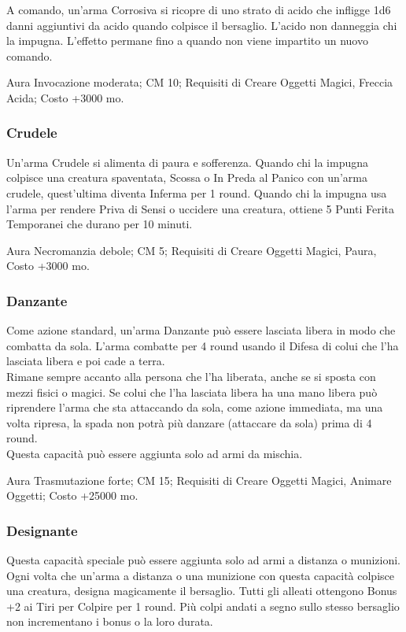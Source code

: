 \begin{multicols}{2}
A comando, un'arma Corrosiva si ricopre di uno strato di acido che infligge 1d6 danni aggiuntivi da acido quando colpisce il bersaglio. L'acido non danneggia chi la impugna. L'effetto permane fino a quando non viene impartito un nuovo comando.

Aura Invocazione moderata; CM 10; Requisiti di Creare Oggetti Magici, Freccia Acida; Costo +3000 mo.


\subsubsection{Crudele}

Un'arma Crudele si alimenta di paura e sofferenza. Quando chi la impugna colpisce una creatura spaventata, Scossa o In Preda al Panico con un'arma crudele, quest'ultima diventa Inferma per 1 round. Quando chi la impugna usa l'arma per rendere Priva di Sensi o uccidere una creatura, ottiene 5 Punti Ferita Temporanei che durano per 10 minuti.

Aura Necromanzia debole; CM 5; Requisiti di Creare Oggetti Magici, Paura, Costo +3000 mo.

\subsubsection{Danzante}

Come azione standard, un'arma Danzante può essere lasciata libera in modo che combatta da sola. L'arma combatte per 4 round usando il Difesa di colui che l'ha lasciata libera e poi cade a terra. \\
Rimane sempre accanto alla persona che l'ha liberata, anche se si sposta con mezzi fisici o magici. Se colui che l'ha lasciata libera ha una mano libera può riprendere l'arma che sta attaccando da sola, come azione immediata, ma una volta ripresa, la spada non potrà più danzare (attaccare da sola) prima di 4 round.\\
Questa capacità può essere aggiunta solo ad armi da mischia.

Aura Trasmutazione forte; CM 15; Requisiti di Creare Oggetti Magici, Animare Oggetti; Costo +25000 mo.

\subsubsection{Designante}

Questa capacità speciale può essere aggiunta solo ad armi a distanza o munizioni. Ogni volta che un'arma a distanza o una munizione con questa capacità colpisce una creatura, designa magicamente il bersaglio. Tutti gli alleati ottengono Bonus +2 ai Tiri per Colpire per 1 round. Più colpi andati a segno sullo stesso bersaglio non incrementano i bonus o la loro durata.


\end{multicols}
